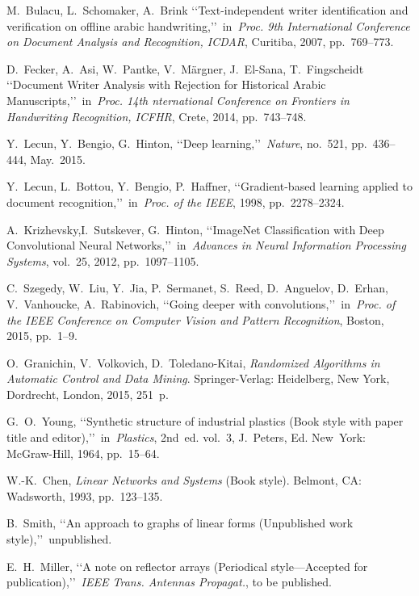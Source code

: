 \documentclass[conference,a4paper,twocolumn]{IEEEtran}
\begin{document}
\begin{thebibliography}{99}

 M.~Bulacu, L.~Schomaker, A.~Brink \lq\lq Text-independent writer identification and verification on offline arabic handwriting,\rq\rq~in~\emph{Proc. 9th International Conference on Document Analysis and Recognition, ICDAR}, Curitiba, 2007, pp.~769--773.

 D.~Fecker, A.~Asi, W.~Pantke, V.~Märgner, J.~El-Sana, T.~Fingscheidt \lq\lq Document Writer Analysis with Rejection for Historical Arabic Manuscripts,\rq\rq~in~\emph{Proc. 14th nternational Conference on Frontiers in Handwriting Recognition, ICFHR}, Crete, 2014, pp.~743--748.

 Y.~Lecun, Y.~Bengio, G.~Hinton, \lq\lq Deep learning,\rq\rq~\emph{Nature}, no.~521, pp.~436--444, May.~2015.

 Y.~Lecun, L.~Bottou, Y.~Bengio, P.~Haffner, \lq\lq Gradient-based learning applied to document recognition,\rq\rq~in~\emph{Proc. of the IEEE}, 1998, pp.~2278--2324.

 A.~Krizhevsky,I.~Sutskever, G.~Hinton, \lq\lq ImageNet Classification with Deep Convolutional Neural Networks,\rq\rq~in~\emph{Advances in Neural Information Processing Systems}, vol.~25, 2012, pp.~1097--1105.

 C.~Szegedy, W.~Liu, Y.~Jia, P.~Sermanet, S.~Reed, D.~Anguelov, D.~Erhan, V.~Vanhoucke, A.~Rabinovich, \lq\lq Going deeper with convolutions,\rq\rq~in~\emph{Proc. of the IEEE Conference on Computer Vision and Pattern Recognition}, Boston, 2015, pp.~1--9.

 O.~Granichin, V.~Volkovich, D.~Toledano-Kitai, \emph{Randomized Algorithms in Automatic Control and Data Mining}.	Springer-Verlag: Heidelberg, New York, Dordrecht, London, 2015, 251~p.

 G.~O.~Young, \lq\lq Synthetic structure of industrial plastics (Book style with paper title and editor),\rq\rq~in~\emph{Plastics}, 2nd~ed. vol.~3, J.~Peters, Ed. New~York: McGraw-Hill, 1964, pp.~15--64.

 W.-K.~Chen, \emph{Linear Networks and Systems} (Book style).	Belmont, CA: Wadsworth, 1993, pp.~123--135.

 B.~Smith, \lq\lq An approach to graphs of linear forms (Unpublished work style),\rq\rq~unpublished.

 E.~H.~Miller, \lq\lq A note on reflector arrays (Periodical style---Accepted for publication),\rq\rq~\emph{IEEE Trans. Antennas Propagat.}, to be published.


\end{thebibliography}
\end{document}
